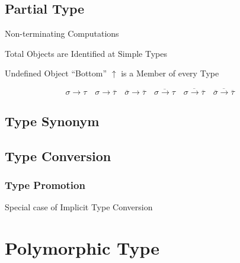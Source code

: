 \subsection{Partial Type}\label{sec:partial_type}

\cite{thompson99}

Non-terminating Computations

Total Objects are Identified at Simple Types

Undefined Object ``Bottom'' $\uparrow$ is a Member of every Type

\[
  \sigma \rightarrow \tau \quad
  \sigma \rightarrow \overline{\tau} \quad
  \overline{\sigma} \rightarrow \overline{\tau} \quad
  \overline{\sigma \rightarrow \tau} \quad
  \overline{\sigma \rightarrow \overline{\tau}} \quad
  \overline{\overline{\sigma} \rightarrow \overline{\tau}} \quad
\]



\subsection{Type Synonym}\label{sec:type_synonym}

\subsection{Type Conversion}\label{sec:type_conversion}

\subsubsection{Type Promotion}\label{sec:type_promotion}

Special case of Implicit Type Conversion



\section{Polymorphic Type}\label{sec:polymorphic_type}

